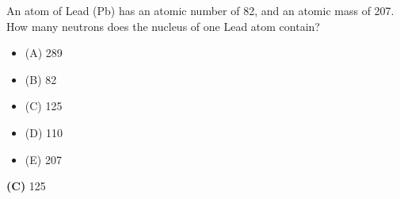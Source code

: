 

An atom of Lead (Pb) has an atomic number of 82, and an atomic mass of 207.  How many neutrons does the nucleus of one Lead atom contain?

\begin{itemize}
\item{(A)} 289
\vskip 5pt 
\item{(B)} 82
\vskip 5pt 
\item{(C)} 125
\vskip 5pt 
\item{(D)} 110
\vskip 5pt 
\item{(E)} 207
\end{itemize}







{\bf (C)} 125
 










